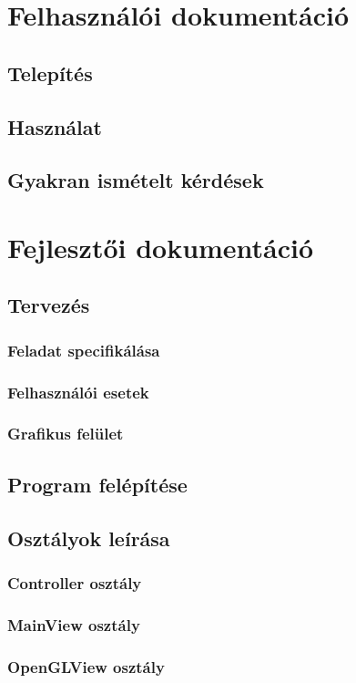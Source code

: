\documentclass{elteikthesis}
\begin{document}
\chapter{Felhasználói dokumentáció}
\section{Telepítés}
\section{Használat}
\section{Gyakran ismételt kérdések}

\chapter{Fejlesztői dokumentáció}
\section{Tervezés}
\subsection{Feladat specifikálása}
\subsection{Felhasználói esetek}
\subsection{Grafikus felület}
\section{Program felépítése}
\section{Osztályok leírása}
\subsection{Controller osztály}
\subsection{MainView osztály}
\subsection{OpenGLView osztály}
\end{document}
